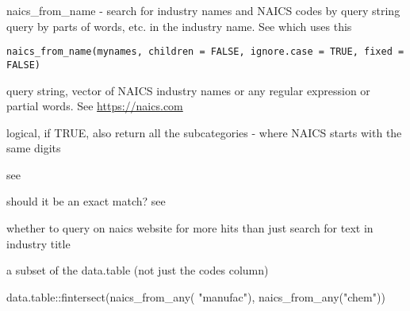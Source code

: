 \documentclass[a4paper]{book}
\begin{document}
\begin{Description}\relax
naics\_from\_name - search for industry names and NAICS codes by query string
query by parts of words, etc. in the industry name.
See  which uses this
\end{Description}
%
\begin{Usage}
\begin{verbatim}
naics_from_name(mynames, children = FALSE, ignore.case = TRUE, fixed = FALSE)
\end{verbatim}
\end{Usage}
%
\begin{Arguments}
\begin{ldescription}
\item[\code{mynames}] query string, vector of NAICS industry names or any regular expression or partial words. See \url{https://naics.com}

\item[\code{children}] logical, if TRUE, also return all the subcategories - where NAICS starts with the same digits

\item[\code{ignore.case}] see 

\item[\code{fixed}] should it be an exact match? see 

\item[\code{search\_on\_naics\_website}] whether to query on naics website for more hits than just search for text in industry title
\end{ldescription}
\end{Arguments}
%
\begin{Value}
a subset of the  data.table (not just the codes column)
\end{Value}
%
\begin{SeeAlso}\relax
{}     
\end{SeeAlso}
%
\begin{Examples}
\begin{ExampleCode}
 data.table::fintersect(naics_from_any( "manufac"), naics_from_any("chem"))
\end{ExampleCode}
\end{Examples}
\end{document}

